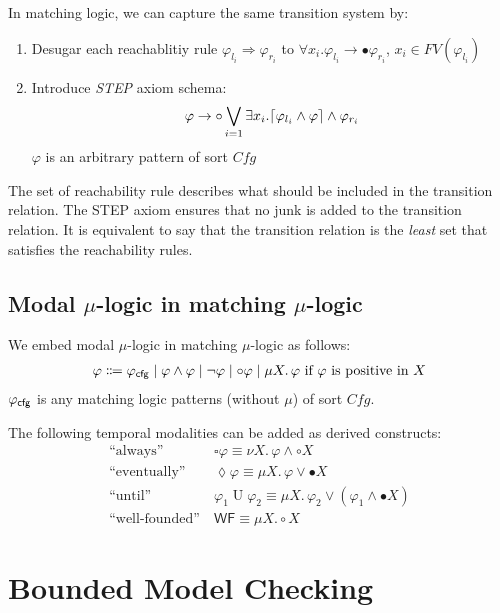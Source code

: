 \documentclass{article}
\newcommand{\ldot}{\mathord{.}} %
\newcommand{\imp}{\to}
\newcommand{\To}{\Rightarrow}
\newcommand{\FV}{\mathit{FV}}
\newcommand{\until}{\mathbin{U}}
\newcommand{\wnext}{{\circ}}
\newcommand{\snext}{{\bullet}}
\newcommand{\always}{{\square}}
\newcommand{\eventually}{{\lozenge}}
\newcommand{\wellfounded}{{\mathsf{WF}}}
\newcommand{\cfg}{\textnormal{\textsf{cfg}\xspace}}
\DeclarePairedDelimiter{\ceil}{\lceil}{\rceil}
\newcommand{\Cfg}{\mathit{Cfg}}
\begin{document}
In matching logic, we can capture the same transition system by:
\begin{enumerate}
	\item Desugar each reachablitiy rule $\varphi_{l_i} \To \varphi_{r_i}$ to 
	      $\forall x_i \ldot \varphi_{l_i} \imp \snext \varphi_{r_i}$, $x_i \in \FV(\varphi_{l_i})$
	\item Introduce \emph{STEP} axiom schema: 
	    \begin{align*}
	    	\varphi \imp \wnext \bigvee_{i=1} \exists x_i \ldot \ceil{ \varphi_{l_i} \wedge \varphi} \wedge \varphi_{r_i}
	    \end{align*}
	    $\varphi$ is an arbitrary pattern of sort $\Cfg$ 
\end{enumerate}
The set of reachability rule describes what should be included in the transition relation.
The STEP axiom ensures that no junk is added to the transition relation.
It is equivalent to say that the transition relation is the \emph{least} set that satisfies the reachability rules.  

\subsection{Modal $\mu$-logic in matching $\mu$-logic}
We embed modal $\mu$-logic in matching $\mu$-logic as follows:
\begin{align*}
\varphi \Coloneqq
\varphi_\cfg \mid
\varphi \wedge \varphi \mid
\neg \varphi \mid 
\wnext \varphi \mid
\mu X .\, \varphi \text{ if $\varphi$ is positive in $X$}
\end{align*}
$\varphi_\cfg$ is any matching logic patterns (without $\mu$) of sort $\Cfg$.

The following temporal modalities can be added as derived constructs:
\vspace*{-1ex}
\begin{align*}
\text{``always''} &\ 
\always \varphi \equiv \nu X \ldot\, \varphi \wedge \wnext X
\\
\text{``eventually''} &\ 
\eventually \varphi \equiv \mu X \ldot\, \varphi \vee \snext X
\\
\text{``until''}  &\ 
\varphi_1 \until \varphi_2 \equiv 
\mu X \ldot\, \varphi_2 \vee (\varphi_1 \wedge \snext X)
\\
\text{``well-founded''} &\
\wellfounded \equiv \mu X \ldot \wnext X
\end{align*}
\vspace*{-5ex}


\section{Bounded Model Checking}
\end{document}
